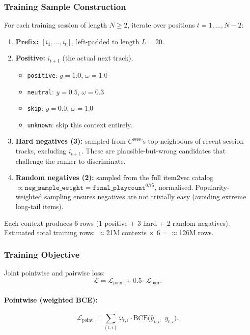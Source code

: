 \documentclass[11pt]{article}
\begin{document}
\subsubsection{Training Sample Construction}

For each training session of length $N \ge 2$, iterate over positions
$t = 1, \ldots, N-2$:

\begin{enumerate}
  \item \textbf{Prefix:} $[i_1, \ldots, i_t]$, left-padded to length $L = 20$.
  \item \textbf{Positive:} $i_{t+1}$ (the actual next track).
        \begin{itemize}
          \item \texttt{positive}: $y = 1.0$, $\omega = 1.0$
          \item \texttt{neutral}: $y = 0.5$, $\omega = 0.3$
          \item \texttt{skip}: $y = 0.0$, $\omega = 1.0$
          \item \texttt{unknown}: skip this context entirely.
        \end{itemize}
  \item \textbf{Hard negatives (3):}
        sampled from $C^{\text{sess}}$'s top-neighbours of recent session
        tracks, excluding $i_{t+1}$. These are plausible-but-wrong candidates
        that challenge the ranker to discriminate.
  \item \textbf{Random negatives (2):}
        sampled from the full item2vec catalog
        $\propto \texttt{neg\_sample\_weight} = \texttt{final\_playcount}^{0.75}$,
        normalised. Popularity-weighted sampling ensures negatives are
        not trivially easy (avoiding extreme long-tail items).
\end{enumerate}

Each context produces 6 rows (1 positive + 3 hard + 2 random negatives).
Estimated total training rows: $\approx$21M contexts $\times$ 6 = $\approx$126M rows.

\subsubsection{Training Objective}

Joint pointwise and pairwise loss:
\[
  \mathcal{L} = \mathcal{L}_{\text{point}} + 0.5 \cdot \mathcal{L}_{\text{pair}}.
\]

\paragraph{Pointwise (weighted BCE):}
\[
  \mathcal{L}_{\text{point}}
  = \sum_{(t,i)} \omega_{t,i} \cdot
    \mathrm{BCE}\!\bigl(\hat{y}_{t,i},\; y_{t,i}\bigr).
\]
\end{document}
